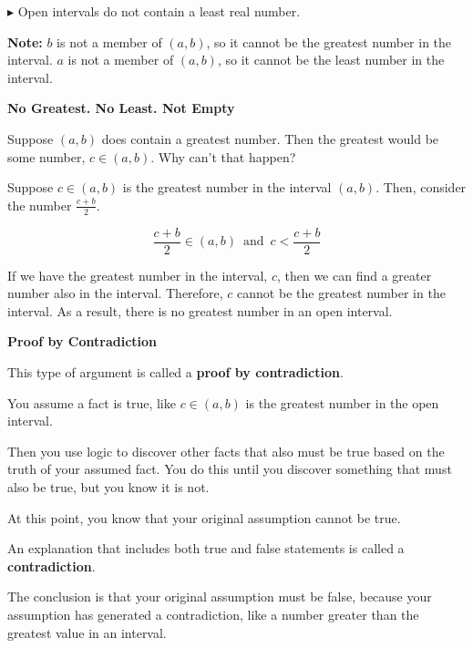 \documentclass{ximera}
\begin{document}
$\blacktriangleright$ Open intervals do not contain a least real number.

\textbf{Note:} $b$ is not a member of $(a,b)$, so it cannot be the greatest number in the interval.    $a$ is not a member of $(a,b)$, so it cannot be the least number in the interval.   


\begin{explanation} \textbf{\textcolor{red!75!green}{No Greatest. No Least. Not Empty}} 

Suppose $(a,b)$ does contain a greatest number. Then the greatest would be some number, $c \in (a,b)$.  Why can't that happen?  


Suppose $c \in (a,b)$ is the greatest number in the interval $(a,b)$.  Then, consider the number  $\frac{c+b}{2}$.   

\[  \frac{c+b}{2} \in (a,b)  \, \text{ and } \,  c < \frac{c+b}{2} \]  


If we have the greatest number in the interval, $c$, then we can find a greater number also in the interval. Therefore, $c$ cannot be the greatest number in the interval.  As a result, there is no greatest number in an open interval. 


\end{explanation}





\begin{paradox} \textbf{\textcolor{red!70!black}{Proof by Contradiction}}

This type of argument is called a \textbf{proof by contradiction}.   

You assume a fact is true, like $c \in (a,b)$ is the greatest number in the open interval.  

Then you use logic to discover other facts that also must be true based on the truth of your assumed fact.  You do this until you discover something that must also be true, but you know it is not. 

At this point, you know that your original assumption cannot be true. 

An explanation that includes both true and false statements is called a \textbf{contradiction}. 

The conclusion is that your original assumption must be false, because your assumption has generated a contradiction, like a number greater than the greatest value in an interval.


\end{paradox}
\end{document}
